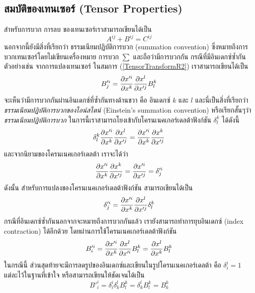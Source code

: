 \subsection{สมบัติของเทนเซอร์ (Tensor Properties)}

สำหรับการบวก การลบ ของเทนเซอร์เราสามารถเขียนได้เป็น
\begin{equation}\label{TensorPropAdd}
A^{ij} + B^{ij} = C^{ij}
\end{equation}
นอกจากนี้ยังมีสิ่งที่เรียกว่า ธรรมเนียมปฏิบัติการบวก (summation convention) ซึ่งหมายถึงการบวกเทนเซอร์โดยไม่เขียนเครื่องหมาย การบวก $\sum$ และถือว่ามีการบวกกัน กรณีที่มีอินเดกซ์ซ้ำกัน ตัวอย่างเช่น จากการแปลงเทนเซอร์ ในสมการ (\ref{TensorTransformR2}) เราสามารถเขียนได้เป็น
\begin{equation}\label{SummationConvention}
B'^i_j = \frac{\partial x'^i}{\partial x^k}\frac{\partial x^l}{\partial x'^j}B^k_l
\end{equation}
จะเห็นว่ามีการบวกกันผ่านอินเดกซ์ที่ซ้ำกันทางด้านขวา คือ อินเดกซ์ $k$ และ $l$ และนี่เป็นสิ่งที่เรียกว่า \emph{ธรรมเนียมปฏิบัติการบวกของไอน์สไตน์} (Einstein's summation convention) หรือเรียกสั้นๆว่า \emph{ธรรมเนียมปฏิบัติการบวก} ในการนี้เราสามารถโยงเข้ากับโครนเนคเกอร์เดลต้าฟังก์ชัน $\delta^k_l$ ได้ดังนี้
\begin{equation}\label{KroneckerDelta}
\delta^k_l\frac{\partial x'^i}{\partial x^k}\frac{\partial x^l}{\partial x'^j} = \frac{\partial x'^i}{\partial x^k}\frac{\partial x^k}{\partial x'^j}
\end{equation}
และจากนิยามของโครนเนคเกอร์เดลต้า เราจะได้ว่า
\begin{equation}\label{Contraction}
\frac{\partial x'^i}{\partial x^k}\frac{\partial x^k}{\partial x'^j} = \frac{\partial x'^i}{\partial x'^j} = \delta'^i_j
\end{equation}
ดังนั้น สำหรับการแปลงของโครนเนคเกอร์เดลต้าฟังก์ชัน สามารถเขียนได้เป็น
\begin{equation}\label{KroneckerDeltaTransform}
\delta'^i_j = \frac{\partial x'^i}{\partial x^k}\frac{\partial x^l}{\partial x'^j}\delta^k_l
\end{equation}
กรณีที่อินเดกซ์ซ้ำกันนอกจากจะหมายถึงการบวกกันแล้ว เรายังสามารถทำการยุบอินเดกซ์ (index contraction) ได้อีกด้วย โดยผ่านการใช้โครนเนคเกอร์เดลต้าฟังก์ชัน
\begin{equation}\label{ContractionTensorR2}
B'^i_i = \frac{\partial x'^i}{\partial x^k}\frac{\partial x^l}{\partial x'^i}B^k_l = \frac{\partial x^l}{\partial x^k}B^k_l
\end{equation}
ในกรณีนี้ ส่วนสุดท้ายจะมีการลดรูปของอินเดกซ์และเขียนในรูปโครนเนคเกอร์เดลต้า คือ $\delta^i_i = 1$ แต่ละไว้ในฐานที่เข้าใจ หรือสามารถเขียนให้ชัดเจนได้เป็น
\begin{equation}\label{ContractionTensorDelta}
B'^i_i = \delta^i_i\delta^l_kB^k_l = \delta^l_kB^k_l = B^k_k
\end{equation}

